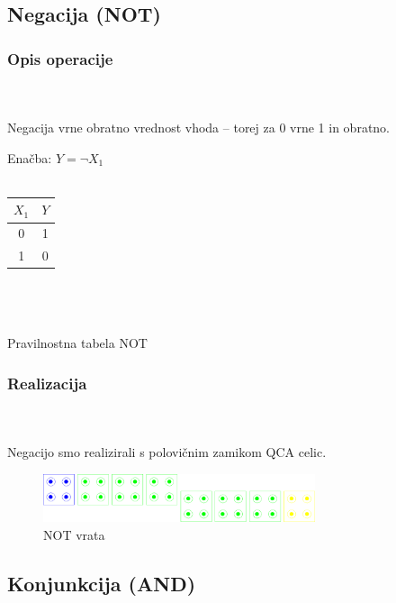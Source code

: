 \documentclass[seminar, slovene]{FRIreport}
\begin{document}
\subsection{Negacija (NOT)}
\subsubsection{Opis operacije}\ \\ \ \\
Negacija vrne obratno vrednost vhoda -- torej za 0 vrne 1 in obratno.
\ \\
\begin{table}[H]
\begin{center}
Enačba: $ Y = \lnot X_1 $\\  \ \\
\begin{tabular}{ | c || c | }\hline
$X_1$ & $Y$ \\ \hline
0 & 1 \\
1 & 0 \\ \hline
\end{tabular}\\ \ \\ \ \\
Pravilnostna tabela NOT
\end{center}
\end{table}

\subsubsection{Realizacija}\ \\ \ \\
Negacijo smo realizirali s polovičnim zamikom QCA celic.
\begin{figure}[H]
\begin{center}
\includegraphics[width=8cm]{qca/img/NOT}
\caption{NOT vrata}
\label{NOT}
\end{center}
\end{figure}
\subsection{Konjunkcija (AND)}
\end{document}
